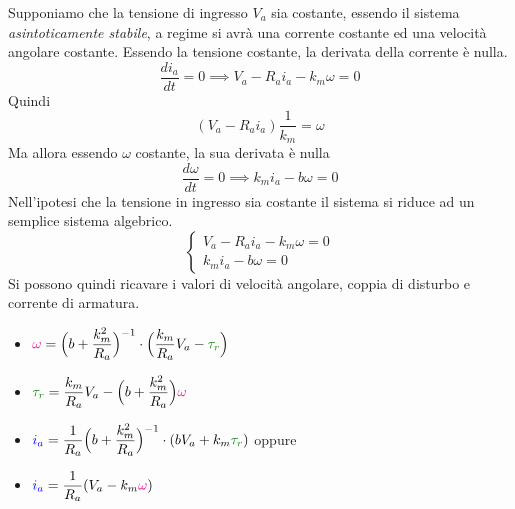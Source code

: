 \documentclass[10pt, letterpaper]{report}
\begin{document}
Supponiamo che la tensione di ingresso $V_a$ sia costante, essendo il sistema  \textit{asintoticamente stabile}, a regime si avrà una corrente costante ed una velocità angolare costante. Essendo la tensione costante, la derivata della corrente è nulla.
$$ \dfrac{di_a}{dt}=0\implies V_a-R_ai_a-k_m\omega = 0$$
Quindi 
$$(V_a-R_ai_a)\frac{1}{k_m}=\omega$$
Ma allora essendo $\omega$ costante, la sua derivata è nulla 
$$ \dfrac{d\omega}{dt}=0\implies k_mi_a-b\omega = 0$$
Nell'ipotesi che la tensione in ingresso sia costante il sistema si riduce ad un semplice sistema algebrico. 
$$\begin{cases}
    V_a-R_ai_a-k_m\omega = 0\\
    k_mi_a-b\omega = 0
\end{cases} $$
Si possono quindi ricavare i valori di velocità angolare, coppia di disturbo e corrente di armatura. \begin{itemize}
    \item $\displaystyle \color{magenta}\omega\color{black} = \Big(b+\frac{k_m^2}{R_a}\Big)^{-1}\cdot\Big(\frac{k_m}{R_a}V_a-\color{darkgreen}\tau_r\color{black}\Big)$
    

    \item $\displaystyle \color{darkgreen}\tau_r\color{black}=\frac{k_m}{R_a}V_a-\Big(b+\frac{k_m^2}{R_a}\Big)\displaystyle \color{magenta}\omega\color{black}$
    \item $\displaystyle \color{blue}i_a\color{black}= 
    \frac{1}{R_a}\Big(b+\frac{k_m^2}{R_a}\Big)^{-1}\cdot (bV_a+k_m\displaystyle \color{darkgreen}\tau_r\color{black})
    $ \acc oppure
    \item $\displaystyle \color{blue}i_a\color{black}= \frac{1}{R_a}(V_a-k_m\color{magenta}\omega\color{black})$
\end{itemize}
\end{document}
